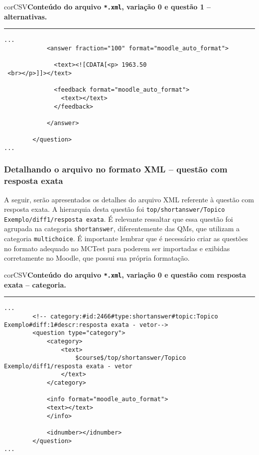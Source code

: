 \begin{myboxCode}{corCSV}{\textbf{Conteúdo do arquivo \texttt{*.xml}, variação 0 e questão 1 -- alternativas.}}\vspace{3mm}
\hrule
{\scriptsize
\begin{verbatim}
...
            <answer fraction="100" format="moodle_auto_format">
            
              <text><![CDATA[<p> 1963.50
 <br></p>]]></text>
 
              <feedback format="moodle_auto_format">
                <text></text>
              </feedback>
              
            </answer>
        
        </question>     
...
\end{verbatim}
}
\end{myboxCode}

\subsubsection{Detalhando o arquivo no formato XML -- questão com resposta exata}

A seguir, serão apresentados os detalhes do arquivo XML referente à questão com resposta exata. A hierarquia desta questão foi \verb|top/shortanswer/Topico Exemplo/diff1/resposta exata|. É relevante ressaltar que essa questão foi agrupada na categoria \verb|shortanswer|, diferentemente das QMs, que utilizam a categoria \verb|multichoice|. É importante lembrar que é necessário criar as questões no formato adequado no MCTest para poderem ser importadas e exibidas corretamente no Moodle, que possui sua própria formatação.

\begin{myboxCode}{corCSV}{\textbf{Conteúdo do arquivo \texttt{*.xml}, variação 0 e questão com resposta exata -- categoria.}}\vspace{3mm}
\hrule
{\scriptsize
\begin{verbatim}
...
        <!-- category:#id:2466#type:shortanswer#topic:Topico Exemplo#diff:1#descr:resposta exata - vetor-->
        <question type="category">
            <category>
                <text>
                    $course$/top/shortanswer/Topico Exemplo/diff1/resposta exata - vetor
                </text>
            </category>
            
            <info format="moodle_auto_format">
            <text></text>
            </info>
            
            <idnumber></idnumber>
        </question>
...
\end{verbatim}
}
\end{myboxCode}

